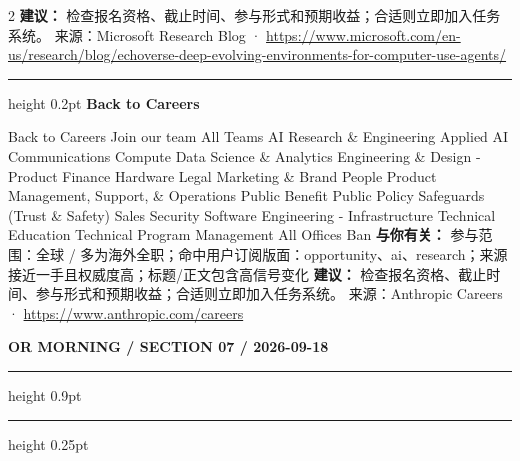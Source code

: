 \documentclass[10.5pt]{ctexart}
\begin{document}
\begin{multicols}{2}
\textbf{建议：} 检查报名资格、截止时间、参与形式和预期收益；合适则立即加入任务系统。
{\footnotesize\color{ormuted} 来源：Microsoft Research Blog · \url{https://www.microsoft.com/en-us/research/blog/echoverse-deep-evolving-environments-for-computer-use-agents/}}
\vspace{2mm}
\hrule height 0.2pt
\vspace{2mm}
{\large\bfseries Back to Careers}\par
Back to Careers Join our team All Teams AI Research \& Engineering Applied AI Communications Compute Data Science \& Analytics Engineering \& Design - Product Finance Hardware Legal Marketing \& Brand People Product Management, Support, \& Operations Public Benefit Public Policy Safeguards (Trust \& Safety) Sales Security Software Engineering - Infrastructure Technical Education Technical Program Management All Offices Ban
\textbf{与你有关：} 参与范围：全球 / 多为海外全职；命中用户订阅版面：opportunity、ai、research；来源接近一手且权威度高；标题/正文包含高信号变化
\textbf{建议：} 检查报名资格、截止时间、参与形式和预期收益；合适则立即加入任务系统。
{\footnotesize\color{ormuted} 来源：Anthropic Careers · \url{https://www.anthropic.com/careers}}
\end{multicols}
\newpage
{\small\bfseries OR MORNING / SECTION 07 / 2026-09-18}
\vspace{2mm}
\hrule height 0.9pt
\vspace{1.5mm}
\hrule height 0.25pt
\vspace{4mm}
\end{document}

